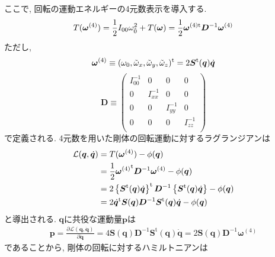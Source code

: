 ここで, 回転の運動エネルギーの4元数表示を導入する. 
\begin{equation}
 T(\bm{\omega}^{(4)})
  =
  \frac{1}{2}I_{00}\omega_{\Tilde{0}}^{2} + T(\bm{\omega})
  =
  \frac{1}{2} \bm{\omega}^{(4) \mathrm{t}} \bm{D}^{-1} \bm{\omega}^{(4)}
\label{eq:RigidBodyMD19}
\end{equation}
ただし, 
\begin{equation}
 \bm{\omega}^{(4)}
  \equiv
  (\omega_{0},\Tilde{\omega}_{x},\Tilde{\omega}_{y},\Tilde{\omega}_{z})^{\mathrm{t}}
  =
 2\bm{S}^{\mathrm{t}} (\bm{q}) \dot{\bm{q}}
\label{eq:RigidBodyMD20}
\end{equation}
\begin{equation}
 \bm{D}
 \equiv
 \begin{pmatrix}
  I^{-1}_{00} & 0           & 0           & 0           \\
  0           & I^{-1}_{xx} & 0           & 0           \\
  0           & 0           & I^{-1}_{yy} & 0           \\
  0           & 0           & 0           & I^{-1}_{zz} \\
 \end{pmatrix}
\label{eq:RigidBodyMD21}
\end{equation}
で定義される. 4元数を用いた剛体の回転運動に対するラグランジアンは
\begin{align}
 \mathcal{L}(\bm{q},\dot{\bm{q}})
 &=
 T(\bm{\omega}^{(4)}) - \phi(\bm{q})
 \notag
 \\
 &=
 \frac{1}{2} {\bm{\omega}^{(4)}}^{\mathrm{t}} \bm{D}^{-1} \bm{\omega}^{(4)} - \phi(\bm{q})
 \notag
 \\
 &=
 2 \left\{
         \bm{S}^{\mathrm{t}} (\bm{q}) \dot{\bm{q}}
 \right\}^{\mathrm{t}}
 \bm{D}^{-1}
 \left\{
        \bm{S}^{\mathrm{t}}(\bm{q}) \dot{\bm{q}}
 \right\}
 - \phi(\bm{q})
 \notag
 \\
 &=
 2 \dot{\bm{q}}^{\mathrm{t}} \bm{S}(\bm{q})
 \bm{D}^{-1}
 \bm{S}^{\mathrm{t}}(\bm{q}) \dot{\bm{q}}
 - \phi(\bm{q})
\label{eq:RigidBodyMD22}
\end{align}
と導出される. 
$\bm{q}$に共役な運動量$\bm{p}$は
\begin{align}
 \bm{p}
 =
 \frac{\partial \mathcal{L}(\bm{q},\dot{\bm{q}})}{\partial \dot{\bm{q}}}
 =
 4 \bm{S}(\bm{q}) \bm{D}^{-1}
 \bm{S}^{\mathrm{t}}(\bm{q})
 \dot{\bm{q}}
 =
 2 \bm{S}(\bm{q}) \bm{D}^{-1} \bm{\omega}^{(4)}
\label{eq:RigidBodyMD23}
\end{align}
であることから, 剛体の回転に対するハミルトニアンは
